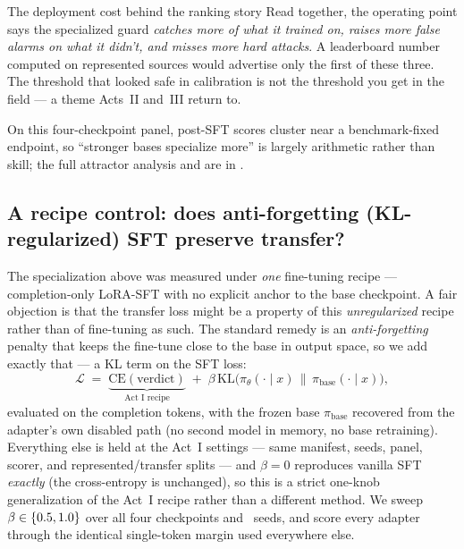 \begin{takeaway}{The deployment cost behind the ranking story}
Read together, the operating point says the specialized guard \emph{catches more of what it trained on,
raises more false alarms on what it didn't, and misses more hard attacks}. A leaderboard number computed
on represented sources would advertise only the first of these three. The threshold that looked safe in
calibration is not the threshold you get in the field --- a theme Acts~II and~III return to.
\end{takeaway}

\noindent On this four-checkpoint panel, post-SFT scores cluster near a benchmark-fixed endpoint, so ``stronger bases specialize more'' is largely arithmetic rather than skill; the full attractor analysis and  are in .

\subsection{A recipe control: does anti-forgetting (KL-regularized) SFT preserve transfer?}
\label{sec:actI-klsft}

The specialization above was measured under \emph{one} fine-tuning recipe --- completion-only LoRA-SFT with
no explicit anchor to the base checkpoint. A fair objection is that the transfer loss might be a property of
this \emph{unregularized} recipe rather than of fine-tuning as such. The standard remedy is an
\emph{anti-forgetting} penalty that keeps the fine-tune close to the base in output space, so we add exactly
that --- a KL term on the SFT loss:
\begin{equation}
\mathcal{L} \;=\; \underbrace{\mathrm{CE}(\text{verdict})}_{\text{Act~I recipe}} \;+\;
\beta\,\mathrm{KL}\!\big(\pi_\theta(\cdot\mid x)\,\big\|\,\pi_{\text{base}}(\cdot\mid x)\big),
\label{eq:klsft}
\end{equation}
evaluated on the completion tokens, with the frozen base $\pi_{\text{base}}$ recovered from the adapter's own
disabled path (no second model in memory, no base retraining). Everything else is held at the Act~I settings
--- same manifest, seeds, panel, scorer, and represented/transfer splits --- and $\beta=0$ reproduces vanilla
SFT \emph{exactly} (the cross-entropy is unchanged), so this is a strict one-knob generalization of the Act~I
recipe rather than a different method. We sweep $\beta\in\{0.5, 1.0\}$ over all four checkpoints and
\KLNSeeds\ seeds, and score every adapter through the identical single-token margin used everywhere else.

